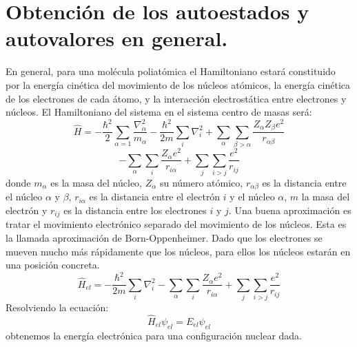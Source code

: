 \documentclass[a4paper]{article}
\begin{document}
\section{Obtención de los autoestados y autovalores en general.}
En general, para una molécula poliatómica el Hamiltoniano estará constituido por la energía cinética del movimiento de los núcleos atómicos, la energía cinética de los electrones de cada átomo, y la interacción electrostática entre electrones y núcleos. El Hamiltoniano del sistema en el sistema centro de masas será:
$$
\hat H = -\frac{\hbar^2}{2}\sum_{\alpha=1}\frac{\nabla_\alpha^2}{m_\alpha}-\frac{\hbar^2}{2m}\sum_{i}\nabla_i^2+\sum_\alpha\sum_{\beta >\alpha}\frac{Z_\alpha Z_\beta e^2}{r_{\alpha \beta}}
$$
\begin{equation}
-\sum_\alpha\sum_i\frac{Z_\alpha e^2}{r_{i\alpha}}+\sum_j\sum_{i>j}\frac{e^2}{r_{ij}}
\end{equation}
donde $m_\alpha$ es la masa del núcleo, $Z_\alpha$ su número atómico, $r_{\alpha\beta}$ es la distancia entre el núcleo $\alpha$ y $\beta$, $r_{i\alpha}$ es la distancia entre el electrón $i$ y el núcleo $\alpha$, $m$ la masa del electrón y $r_{ij}$ es la distancia entre los electrones $i$ y $j$. 
Una buena aproximación es tratar el movimiento electrónico separado del movimiento de los núcleos. Esta es la llamada aproximación de Born-Oppenheimer. Dado que los electrones se mueven mucho más rápidamente que los núcleos, para ellos los núcleos estarán en una posición concreta. 
\begin{equation}
\hat H_{el} = -\frac{\hbar^2}{2m}\sum_{i}\nabla_i^2-\sum_\alpha\sum_i\frac{Z_\alpha e^2}{r_{i\alpha}}+\sum_j\sum_{i>j}\frac{e^2}{r_{ij}}
\end{equation}
Resolviendo la ecuación:
\begin{equation}
\hat H_{el}\psi_{el}=E_{el}\psi_{el}
\end{equation}
obtenemos la energía electrónica para una configuración nuclear dada.
\end{document}
